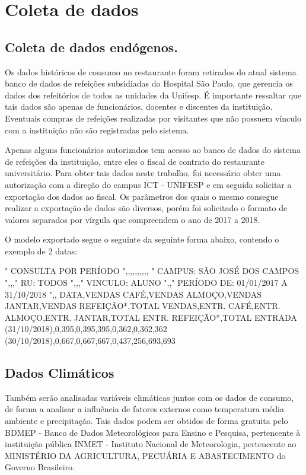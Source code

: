 \documentclass[	12pt, Times, openright, twoside, a4paper, english, brazil]{abntex2}
\begin{document}
	\section{Coleta de dados}
	
	\subsection{Coleta de dados endógenos.}
    	Os dados históricos de consumo no restaurante foram retirados do atual sistema banco de dados de refeições subsidiadas do Hospital São Paulo, que gerencia os dados dos refeitórios de todos as unidades da Unifesp. É importante ressaltar que tais dados são apenas de funcionários, docentes e discentes da instituição. Eventuais compras de refeições realizadas por visitantes que não possuem vínculo com a instituição não são registradas pelo sistema. 
    	
    	Apenas alguns funcionários autorizados tem acesso ao banco de dados do sistema de refeições da instituição, entre eles o fiscal de contrato do restaurante universitário. Para obter tais dados neste trabalho, foi necessário obter uma autorização com a direção do campus ICT - UNIFESP e em seguida solicitar a exportação dos dados ao fiscal. Os parâmetros dos quais o mesmo consegue realizar a exportação de dados são diversos, porém foi solicitado o formato de valores separados por vírgula que compreendem o ano de 2017 a 2018.
	
	O modelo exportado segue o seguinte da seguinte forma abaixo, contendo o exemplo de 2 datas: \\
	\begin{algorithm}[H]
		"
		CONSULTA POR PERÍODO                    ",,,,,,,,,,
		"
		CAMPUS: SÃO JOSÉ DOS CAMPOS                    ",,,"
		RU: TODOS                    ",,,"
		VINCULO: ALUNO                    ",,"
		PERÍODO DE: 01/01/2017 A 31/10/2018                        ",,
		DATA,VENDAS CAFÉ,VENDAS ALMOÇO,VENDAS JANTAR,VENDAS REFEIÇÃO*,TOTAL VENDAS,ENTR. CAFÉ,ENTR. ALMOÇO,ENTR. JANTAR,TOTAL ENTR. REFEIÇÃO*,TOTAL ENTRADA
		(31/10/2018),0,395,0,395,395,0,362,0,362,362
		(30/10/2018),0,667,0,667,667,0,437,256,693,693
	\end{algorithm}
	
	
	\subsection{Dados Climáticos}
    	Também serão analisadas variáveis climáticas juntos com os dados de consumo, de forma a analisar a influência de fatores externos como temperatura média ambiente e precipitação. Tais dados podem ser obtidos de forma gratuita pelo BDMEP - Banco de Dados Meteorológicos para Ensino e Pesquisa, pertencente à instituição pública INMET - Instituto Nacional de Meteorologia, pertencente ao MINISTÉRIO DA AGRICULTURA, PECUÁRIA E ABASTECIMENTO do Governo Brasileiro. 
    	
\end{document}

